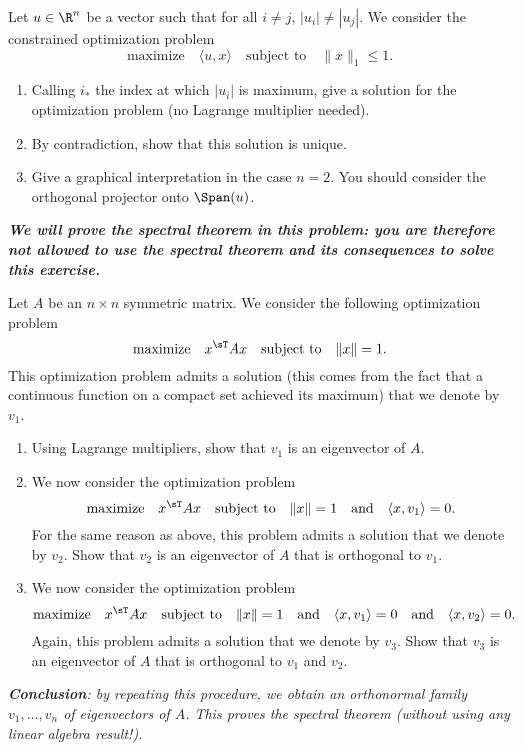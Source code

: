 \documentclass[11pt,nocut]{article}
\begin{document}
\begin{problem}[2 points]
	Let $u \in \R^n$ be a vector such that for all $i \neq j$, $|u_i| \neq |u_j|$. We consider the constrained optimization problem
	$$
	\text{maximize} \quad \langle u ,x \rangle \quad \text{subject to} \quad \|x\|_1 \leq 1.
	$$
	\begin{enumerate}[label=\normalfont(\textbf{\alph*})]
		\item Calling $i_*$ the index at which $|u_i|$ is maximum, give a solution for the optimization problem (no Lagrange multiplier needed). 
		\item By contradiction, show that this solution is unique.
		\item Give a graphical interpretation in the case $n=2$. You should consider the orthogonal projector onto $\Span(u)$.
	\end{enumerate}
\end{problem}

\newpage

\begin{problem}[3 points]
	\emph{\textbf{We will prove the spectral theorem in this problem: you are therefore not allowed to use the spectral theorem and its consequences to solve this exercise.}}

	Let $A$ be an $n \times n$ symmetric matrix. We consider the following optimization problem
	\begin{equation}\label{eq:eig1}
		\text{maximize} \quad x^{\sT} A x \quad \text{subject to} \quad \|x\| = 1.
	\end{equation}
	This optimization problem admits a solution (this comes from the fact that a continuous function on a compact set achieved its maximum) that we denote by $v_1$.
	\begin{enumerate}[label=\normalfont(\textbf{\alph*})]
		\item Using Lagrange multipliers, show that $v_1$ is an eigenvector of $A$.
		\item We now consider the optimization problem
	\begin{equation}\label{eq:eig2}
		\text{maximize} \quad x^{\sT} A x \quad \text{subject to} \quad \|x\| = 1
		\quad \text{and} \quad \langle x,v_1 \rangle = 0.
	\end{equation}
	For the same reason as above, this problem admits a solution that we denote by $v_2$. Show that $v_2$ is an eigenvector of $A$ that is orthogonal to $v_1$.
		\item We now consider the optimization problem
	\begin{equation}\label{eq:eig3}
		\text{maximize} \quad x^{\sT} A x \quad \text{subject to} \quad \|x\| = 1
		\quad \text{and} \quad \langle x,v_1 \rangle = 0
		\quad \text{and} \quad \langle x,v_2 \rangle = 0.
	\end{equation}
	Again, this problem admits a solution that we denote by $v_3$. Show that $v_3$ is an eigenvector of $A$ that is orthogonal to $v_1$ and $v_2$.
	\end{enumerate}
	\emph{
		\textbf{Conclusion}: by repeating this procedure, we obtain an orthonormal family $v_1, \dots, v_n$ of eigenvectors of $A$. This proves the spectral theorem (without using any linear algebra result!).
	}
\end{problem}
\end{document}
